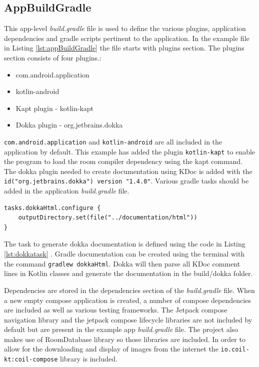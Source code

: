 \documentclass[12pt]{article}
\begin{document}
\subsection{AppBuildGradle}

This app-level  \textit{build.gradle} file is used to define the various plugins, application dependencies and gradle scripts pertinent to the application. In the example file in Listing \ref{lst:appBuildGradle} the file starts with plugins section. The plugins section consists of four plugins.:
\begin{itemize}
    \item com.android.application
    \item kotlin-android
    \item Kapt plugin - kotlin-kapt
    \item Dokka plugin - org.jetbrains.dokka
\end{itemize}
\verb|com.android.application| and \verb|kotlin-android| are all included in the application by default. This example has added the plugin \verb|kotlin-kapt| to enable the program to load the room compiler dependency using the kapt command. The dokka plugin needed to create documentation using KDoc is added with the \verb|id("org.jetbrains.dokka") version "1.4.0"|.
Various gradle tasks should be added in the application \textit{build.gradle} file. 
\begin{lstlisting}[numbers=none, 
			caption=Task to generate Dokka documentation,
			label={lst:dokkatask}]
tasks.dokkaHtml.configure {
    outputDirectory.set(file("../documentation/html"))
}
\end{lstlisting}
The task to generate dokka documentation is defined using the code in Listing \ref{lst:dokkatask} . Gradle documentation can be created using the terminal with the command \verb|gradlew dokkaHtml|. Dokka will then parse all KDoc comment lines in Kotlin classes and generate the documentation in the build/dokka folder. 

Dependencies are stored in the dependencies section of the \textit{build.gradle} file. When a new empty compose application is created, a number of compose dependencies are included as well as various testing frameworks. The Jetpack compose navigation library and the jetpack compose lifecycle libraries are not included by default but are present in the example app \textit{build.gradle} file. The project also makes use of RoomDatabase library so those libraries are included. In order to allow for the downloading and display of images from the internet the \verb|io.coil-kt:coil-compose| library is included. 
\end{document}
